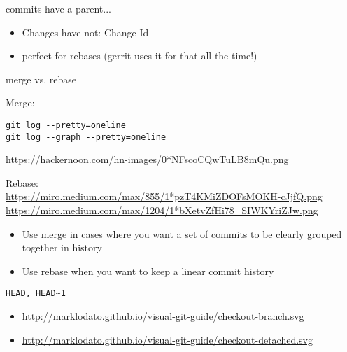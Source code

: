 \documentclass[landscape]{slides}
\begin{document}
\begin{slide}
commits have a parent...

\begin{itemize}
\item{} Changes have not: Change-Id
\item{} perfect for rebases (gerrit uses it for that all the time!)
\end{itemize}
\end{slide}

\begin{slide}
merge vs. rebase

\begin{small}
Merge:
\begin{verbatim}
git log --pretty=oneline
git log --graph --pretty=oneline
\end{verbatim}
\url{https://hackernoon.com/hn-images/0*NFscoCQwTuLB8mQu.png}

Rebase: \\
\url{https://miro.medium.com/max/855/1*pzT4KMiZDOFsMOKH-cJjfQ.png} \\
\url{https://miro.medium.com/max/1204/1*bXetvZfHi78_SIWKYriZJw.png}

\begin{itemize}
\item{} Use merge in cases where you want a set of commits to be clearly grouped together in history
\item{} Use rebase when you want to keep a linear commit history
\end{itemize}
\end{small}
\end{slide}

\begin{slide}
\begin{verbatim}
HEAD, HEAD~1
\end{verbatim}

\begin{small}
\begin{itemize}
	\item{} \url{http://marklodato.github.io/visual-git-guide/checkout-branch.svg}
	\item{} \url{http://marklodato.github.io/visual-git-guide/checkout-detached.svg}
\end{itemize}
\end{small}
\end{slide}
\end{document}
